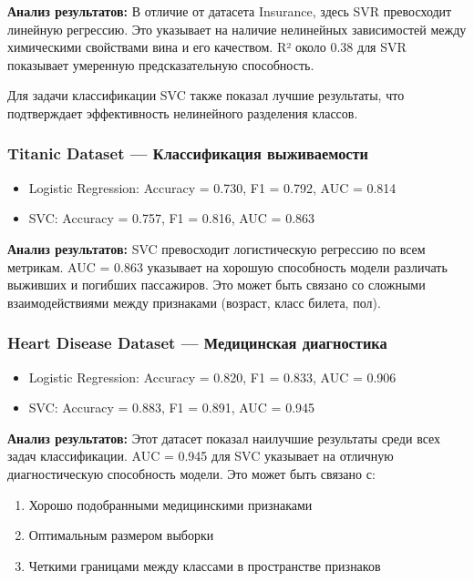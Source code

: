 \documentclass[a4paper]{article}
\begin{document}
\textbf{Анализ результатов:}
В отличие от датасета Insurance, здесь SVR превосходит линейную регрессию. Это указывает на наличие нелинейных зависимостей между химическими свойствами вина и его качеством. R² около 0.38 для SVR показывает умеренную предсказательную способность.

Для задачи классификации SVC также показал лучшие результаты, что подтверждает эффективность нелинейного разделения классов.

\subsubsection{Titanic Dataset — Классификация выживаемости}

\begin{itemize}
    \item Logistic Regression: Accuracy = 0.730, F1 = 0.792, AUC = 0.814
    \item SVC: Accuracy = 0.757, F1 = 0.816, AUC = 0.863
\end{itemize}

\textbf{Анализ результатов:}
SVC превосходит логистическую регрессию по всем метрикам. AUC = 0.863 указывает на хорошую способность модели различать выживших и погибших пассажиров. Это может быть связано со сложными взаимодействиями между признаками (возраст, класс билета, пол).

\subsubsection{Heart Disease Dataset — Медицинская диагностика}

\begin{itemize}
    \item Logistic Regression: Accuracy = 0.820, F1 = 0.833, AUC = 0.906
    \item SVC: Accuracy = 0.883, F1 = 0.891, AUC = 0.945
\end{itemize}

\textbf{Анализ результатов:}
Этот датасет показал наилучшие результаты среди всех задач классификации. AUC = 0.945 для SVC указывает на отличную диагностическую способность модели. Это может быть связано с:
\begin{enumerate}
    \item Хорошо подобранными медицинскими признаками
    \item Оптимальным размером выборки
    \item Четкими границами между классами в пространстве признаков
\end{enumerate}
\end{document}
